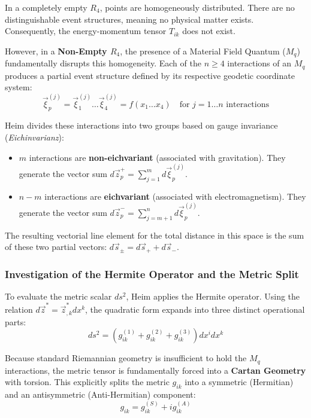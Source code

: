 \documentclass[11pt,a4paper,oneside]{article}
\begin{document}
In a completely empty $R_4$, points are homogeneously distributed. There are no distinguishable event structures, meaning no physical matter exists. Consequently, the energy-momentum tensor $T_{ik}$ does not exist. 

However, in a \textbf{Non-Empty $R_4$}, the presence of a Material Field Quantum ($M_q$) fundamentally disrupts this homogeneity. Each of the $n \ge 4$ interactions of an $M_q$ produces a partial event structure defined by its respective geodetic coordinate system:
\begin{equation}
    \vec{\xi}_p^{(j)} = \vec{\xi}_1^{(j)} \dots \vec{\xi}_4^{(j)} = f(x_1 \dots x_4) \quad \text{for } j = 1 \dots n \text{ interactions}
\end{equation}

Heim divides these interactions into two groups based on gauge invariance (\textit{Eichinvarianz}):
\begin{itemize}
    \item $m$ interactions are \textbf{non-eichvariant} (associated with gravitation). They generate the vector sum $d\vec{z}_p^+ = \sum_{j=1}^m d\vec{\xi}_p^{(j)}$.
    \item $n-m$ interactions are \textbf{eichvariant} (associated with electromagnetism). They generate the vector sum $d\vec{z}_p^- = \sum_{j=m+1}^n d\vec{\xi}_p^{(j)}$.
\end{itemize}

The resulting vectorial line element for the total distance in this space is the sum of these two partial vectors: $d\vec{s}_{\pm} = d\vec{s}_+ + d\vec{s}_-$.

\subsubsection{Investigation of the Hermite Operator and the Metric Split}

To evaluate the metric scalar $ds^2$, Heim applies the Hermite operator. Using the relation $d\vec{z}^* = \vec{z}_{,k}^* dx^k$, the quadratic form expands into three distinct operational parts:
\begin{equation}
    ds^2 = \left(g_{ik}^{(1)} + g_{ik}^{(2)} + g_{ik}^{(3)}\right) dx^i dx^k
\end{equation}

Because standard Riemannian geometry is insufficient to hold the $M_q$ interactions, the metric tensor is fundamentally forced into a \textbf{Cartan Geometry} with torsion. This explicitly splits the metric $g_{ik}$ into a symmetric (Hermitian) and an antisymmetric (Anti-Hermitian) component:
\begin{equation}
    g_{ik} = g_{ik}^{(S)} + ig_{ik}^{(A)}
\end{equation}
\end{document}
